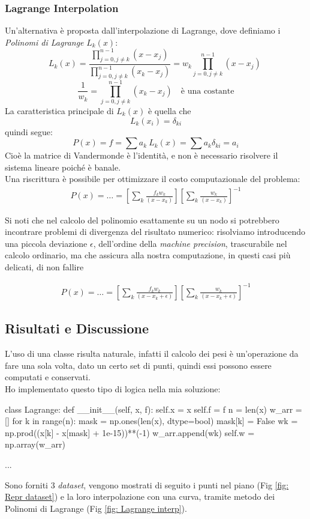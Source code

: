 \documentclass[11pt, a4paper]{article}
\begin{document}
\subsubsection{Lagrange Interpolation}
Un'alternativa è proposta dall'interpolazione di Lagrange, dove definiamo i \textit{Polinomi di Lagrange} $L_k(x)$:
\[
L_k(x) = \frac{\prod_{j=0, j \neq k}^{n-1}(x - x_j)}{\prod_{j=0, j \neq k}^{n-1}(x_k - x_j)} = w_k \prod_{j=0, j \neq k}^{n-1}(x - x_j)\
\]
\[
\frac{1}{w_k} = \prod_{j=0, j \neq k}^{n-1}(x_k - x_j) \quad \text{è una costante}
\]
La caratteristica principale di $L_k(x)$ è quella che 
\[
L_k(x_i) = \delta_{ki}
\]
quindi segue:
\[
P(x) = f = \sum a_k\ L_k(x) = \sum a_k \delta_{ki} = a_i
\]
Cioè la matrice di Vandermonde è l'identità, e non è necessario risolvere il sistema lineare poiché è banale. \\
Una riscrittura è possibile per ottimizzare il costo computazionale del problema:
\[
\begin{aligned}
P(x) = \dots = \left[ \sum_{k} \frac{f_k w_k}{(x - x_k)} \right] \left[ \sum_{k} \frac{w_k}{(x - x_k)} \right]^{-1}
\end{aligned}
\]

\noindent Si noti che nel calcolo del polinomio esattamente su un nodo si potrebbero incontrare problemi di divergenza del risultato numerico: risolviamo introducendo una piccola deviazione $\epsilon$, dell'ordine della \textit{machine precision}, trascurabile nel calcolo ordinario, ma che assicura alla nostra computazione, in questi casi più delicati, di non fallire

\[
\begin{aligned}
P(x) = \dots = \left[ \sum_{k} \frac{f_k w_k}{(x - x_k + \epsilon)} \right] \left[ \sum_{k} \frac{w_k}{(x - x_k + \epsilon)} \right]^{-1}
\end{aligned}
\]

\subsection{Risultati e Discussione}
L'uso di una classe risulta naturale, infatti il calcolo dei pesi è un'operazione da fare una sola volta, dato un certo set di punti, quindi essi possono essere computati e conservati.\\
Ho implementato questo tipo di logica nella mia soluzione:
\begin{elegantcode}
class Lagrange:
    def __init__(self, x, f):
        self.x = x
        self.f = f
        n = len(x)
        w_arr = []
        for k in range(n):
            mask = np.ones(len(x), dtype=bool)
            mask[k] = False
            wk = np.prod((x[k] - x[mask] + 1e-15))**(-1)
            w_arr.append(wk)
        self.w = np.array(w_arr)

    ...
\end{elegantcode}
\bigskip
\noindent Sono forniti 3 \textit{dataset}, vengono mostrati di seguito i punti nel piano (Fig \ref{fig: Repr dataset}) e la loro interpolazione con una curva, tramite metodo dei Polinomi di Lagrange (Fig \ref{fig: Lagrange interp}).
\end{document}
